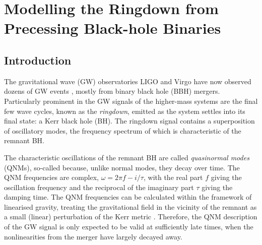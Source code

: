 
\chapter{Modelling the Ringdown from Precessing Black-hole Binaries}

\label{Chapter2}

\section{Introduction}

The gravitational wave (GW) observatories LIGO \cite{LIGOScientific:2014pky} and Virgo \cite{VIRGO:2014yos} have now observed dozens of GW events \cite{LIGOScientific:2018mvr, LIGOScientific:2020ibl}, mostly from binary black hole (BBH) mergers. 
Particularly prominent in the GW signals of the higher-mass systems are the final few wave cycles, known as the \emph{ringdown}, emitted as the system settles into its final state: a Kerr black hole (BH). 
The ringdown signal contains a superposition of oscillatory modes, the frequency spectrum of which is characteristic of the remnant BH.

The characteristic oscillations of the remnant BH are called \emph{quasinormal modes} (QNMs), so-called because, unlike normal modes, they decay over time.
The QNM frequencies are complex, $\omega = 2\pi f - {i}/\tau$, with the real part $f$ giving the oscillation frequency and the reciprocal of the imaginary part $\tau$ giving the damping time. 
The QNM frequencies can be calculated within the framework of linearised gravity, treating the gravitational field in the vicinity of the remnant as a small (linear) perturbation of the Kerr metric \cite{Berti:2009kk}.
Therefore, the QNM description of the GW signal is only expected to be valid at sufficiently late times, when the nonlinearities from the merger have largely decayed away. 

